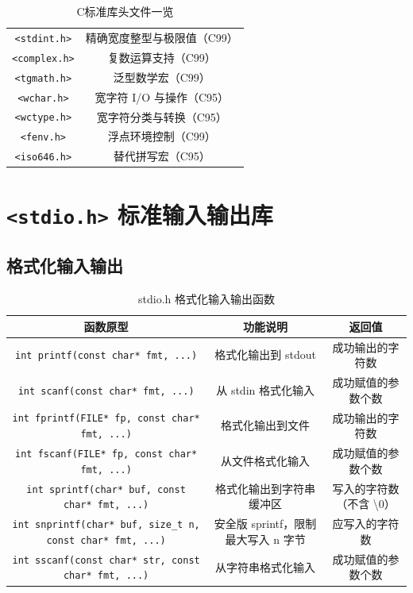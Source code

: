 \begin{table}[H]
\begin{tabulary}{\linewidth}{CC}
\texttt{<stdint.h>} & 精确宽度整型与极限值（C99） \\ 
\texttt{<complex.h>} & 复数运算支持（C99） \\ 
\texttt{<tgmath.h>} & 泛型数学宏（C99） \\ 
\texttt{<wchar.h>} & 宽字符 I/O 与操作（C95） \\ 
\texttt{<wctype.h>} & 宽字符分类与转换（C95） \\ 
\texttt{<fenv.h>} & 浮点环境控制（C99） \\ 
\texttt{<iso646.h>} & 替代拼写宏（C95） \\ \bottomrule
\end{tabulary}
\caption{C标准库头文件一览}
\label{tab:stdlib_overview}
\end{table}

\section{\texorpdfstring{\texttt{<stdio.h>} 标准输入输出库}{<stdio.h> 标准输入输出库}}

\subsection{格式化输入输出}

\begin{table}[H]
\centering
\renewcommand{\arraystretch}{1.6}
\begin{tabulary}{\linewidth}{CCC}
\toprule
\textbf{函数原型} & \textbf{功能说明} & \textbf{返回值} \\ \midrule
\texttt{int printf(const char* fmt, ...)} & 格式化输出到 stdout & 成功输出的字符数 \\ 
\texttt{int scanf(const char* fmt, ...)} & 从 stdin 格式化输入 & 成功赋值的参数个数 \\ 
\texttt{int fprintf(FILE* fp, const char* fmt, ...)} & 格式化输出到文件 & 成功输出的字符数 \\ 
\texttt{int fscanf(FILE* fp, const char* fmt, ...)} & 从文件格式化输入 & 成功赋值的参数个数 \\ 
\texttt{int sprintf(char* buf, const char* fmt, ...)} & 格式化输出到字符串缓冲区 & 写入的字符数（不含 \textbackslash 0） \\ 
\texttt{int snprintf(char* buf, size\_t n, const char* fmt, ...)} & 安全版 sprintf，限制最大写入 n 字节 & 应写入的字符数 \\ 
\texttt{int sscanf(const char* str, const char* fmt, ...)} & 从字符串格式化输入 & 成功赋值的参数个数 \\ \bottomrule
\end{tabulary}
\caption{stdio.h 格式化输入输出函数}
\label{tab:stdio_format}
\end{table}

